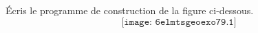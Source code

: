 \'Ecris le programme de construction de la figure ci-dessous.
\[\texttt{[image: 6elmtsgeoexo79.1]}\]